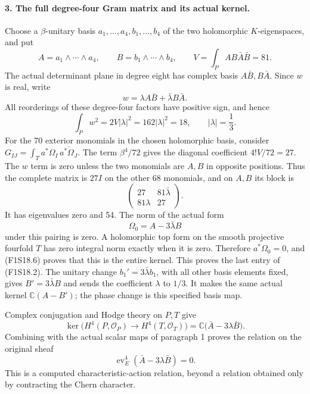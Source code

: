\paragraph{3. The full degree-four Gram matrix and its actual kernel.}
Choose a $\beta$-unitary basis $a_1,\ldots,a_4,b_1,\ldots,b_4$
of the two holomorphic $K$-eigenspaces, and put
\[
 A=a_1\wedge\cdots\wedge a_4,\qquad
 B=b_1\wedge\cdots\wedge b_4,\qquad
 V=\int_PAB\bar A\bar B=81.
\]
The actual determinant plane in degree eight has complex basis
$A\bar B,B\bar A$. Since $w$ is real, write
\[
 w=\lambda A\bar B+\bar\lambda B\bar A.
\]
All reorderings of these degree-four factors have positive sign,
and hence
\[
         \int_Pw^2=2V|\lambda|^2=162|\lambda|^2=18,
                   \qquad |\lambda|=\frac13.
 \tag{F1S18.5}
\]
For the 70 exterior monomials in the chosen holomorphic basis,
consider $G_{IJ}=\int_Ta^*\Omega_I\,\overline{a^*\Omega_J}$.
The term $\beta^4/72$ gives the diagonal coefficient
$4!V/72=27$. The $w$ term is zero unless the two monomials are
$A,B$ in opposite positions. Thus the complete matrix is $27I$
on the other 68 monomials, and on $A,B$ its block is
\[
                   \begin{pmatrix}
                      27&81\bar\lambda\\
                      81\lambda&27
                    \end{pmatrix}.
 \tag{F1S18.6}
\]
It has eigenvalues zero and 54. The norm of the actual form
\[
                       \Omega_0=A-3\bar\lambda B
 \tag{F1S18.7}
\]
under this pairing is zero. A holomorphic top form on the smooth
projective fourfold $T$ has zero integral norm exactly when it
is zero. Therefore $a^*\Omega_0=0$, and (F1S18.6) proves that
this is the entire kernel. This proves the last entry of
(F1S18.2). The unitary change $b_1'=3\bar\lambda b_1$, with all
other basis elements fixed, gives $B'=3\bar\lambda B$ and sends
the coefficient $\lambda$ to $1/3$. It makes the same actual
kernel $\mathbb C(A-B')$; the phase change is this specified
basis map.

Complex conjugation and Hodge theory on $P,T$ give
\[
 \ker\bigl(H^4(P,\mathcal O_P)\to H^4(T,\mathcal O_T)\bigr)
       =\mathbb C\bigl(\bar A-3\lambda\bar B\bigr).
\]
Combining with the actual scalar maps of paragraph 1 proves
the relation on the original sheaf
\[
          \operatorname{ev}_E^4(\bar A-3\lambda\bar B)=0.
 \tag{F1S18.8}
\]
This is a computed characteristic-action relation, beyond a
relation obtained only by contracting the Chern character.

